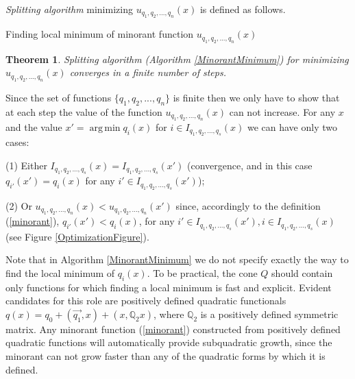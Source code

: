 \documentclass[preprint,12pt]{elsarticle}
\makeatletter
\newtheorem{theorem}{Theorem}[section]
\newenvironment{proof}[1][Proof]{\begin{trivlist}
\item[\hskip \labelsep {\bfseries #1}]}{\end{trivlist}}
\newenvironment{definition}[1][Definition]{\begin{trivlist}
\item[\hskip \labelsep {\bfseries #1}]}{\end{trivlist}}
\DeclareMathOperator*{\argmin}{arg\,min}
\def\BState{\State\hskip-\ALG@thistlm}
\makeatother
\begin{document}
\begin{definition}{\it Splitting algorithm} minimizing $u_{q_{1},q_{2},...,q_{n}}(x)$ is defined as follows.
\end{definition}

\begin{algorithm}
\caption{Finding local minimum of minorant function $u_{q_{1},q_{2},...,q_{n}}(x)$}\label{MinorantMinimum}
\end{algorithm}

\begin{theorem}\label{theoremConvergence} Splitting algorithm (Algorithm \ref{MinorantMinimum}) for minimizing $u_{q_{1},q_{2},...,q_{n}}(x)$ converges in a finite number of steps.
\end{theorem}
\begin{proof}
Since the set of functions $\{q_{1},q_{2},...,q_{n}\}$ is finite then we only have to show that at each step the value of the function $u_{q_{1},q_{2},...,q_{n}}(x)$ can not increase. For any $x$ and the value $x' = \argmin q_i(x)$ for $i\in I_{q_1,q_2,...,q_s}(x)$ we can have only two cases:

(1) Either $I_{q_1,q_2,...,q_s}(x)=I_{q_1,q_2,...,q_s}(x')$ (convergence, and in this case $q_{i'}(x')=q_i(x)$ for any $i'\in I_{q_1,q_2,...,q_s}(x')$);

(2) Or $u_{q_{1},q_{2},...,q_{n}}(x)<u_{q_{1},q_{2},...,q_{n}}(x')$ since, accordingly to the definition (\ref{minorant}), $q_{i'}(x')<q_i(x)$, for any $i'\in I_{q_1,q_2,...,q_s}(x'), i\in I_{q_1,q_2,...,q_s}(x)$ (see Figure \ref{OptimizationFigure}).
\end{proof}

Note that in Algorithm \ref{MinorantMinimum} we do not specify exactly the way to find the local minimum of $q_i(x)$. To be practical, the cone $Q$ should contain only functions for which finding a local minimum is fast and explicit. Evident candidates for this role are positively defined quadratic functionals $q(x)=q_{0}+(\vec{q_1},x)+(x,\mathbb{Q}_2x)$, where $\mathbb{Q}_2$ is a positively defined symmetric matrix. Any minorant function (\ref{minorant}) constructed from positively defined quadratic functions will automatically provide subquadratic growth, since the minorant can not grow faster than any of the quadratic forms by which it is defined.
\end{document}
